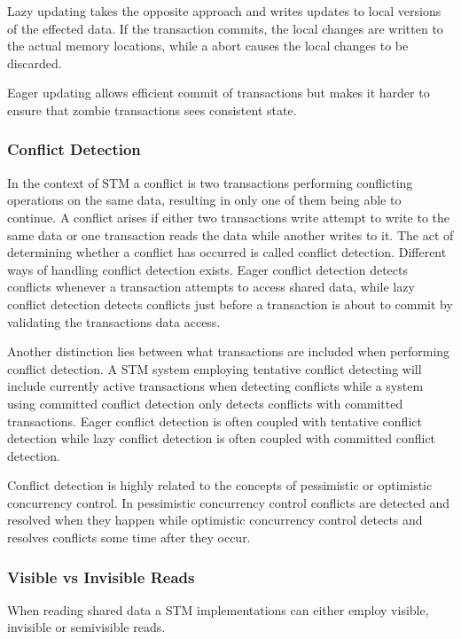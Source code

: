 Lazy updating takes the opposite approach and writes updates to local versions of the effected data\cite[p. 2084]{herlihy2011tm}. If the transaction commits, the local changes are written to the actual memory locations, while a abort causes the local changes to be discarded.

Eager updating allows efficient commit of transactions but makes it harder to ensure that zombie transactions sees consistent state\cite[p. 2084]{herlihy2011tm}.

\subsubsection{Conflict Detection}
In the context of \ac{STM} a conflict is two transactions performing conflicting operations on the same data, resulting in only one of them being able to continue\cite[p. 20]{harris2010transactional}. A conflict arises if either two transactions write attempt to write to the same data or one transaction reads the data while another writes to it. The act of determining whether a conflict has occurred is called conflict detection\cite[p. 20]{harris2010transactional}. Different ways of handling conflict detection exists. Eager conflict detection detects conflicts whenever a transaction attempts to access shared data, while lazy conflict detection detects conflicts just before a transaction is about to commit by validating the transactions data access\cite[p. 21]{harris2010transactional}. 

Another distinction lies between what transactions are included when performing conflict detection. A \ac{STM} system employing tentative conflict detecting will include currently active transactions when detecting conflicts while a system using committed conflict detection only detects conflicts with committed transactions. Eager conflict detection is often coupled with tentative conflict detection while lazy conflict detection is often coupled with committed conflict detection\cite[p. 22]{harris2010transactional}.  

Conflict detection is highly related to the concepts of pessimistic or optimistic concurrency control. In pessimistic concurrency control conflicts are detected and resolved when they happen\cite[p. 20]{harris2010transactional} while optimistic concurrency control detects and resolves conflicts some time after they occur\cite[p. 20]{harris2010transactional}.

\subsubsection{Visible vs Invisible Reads}
When reading shared data a \ac{STM} implementations can either employ visible, invisible or semivisible reads.

